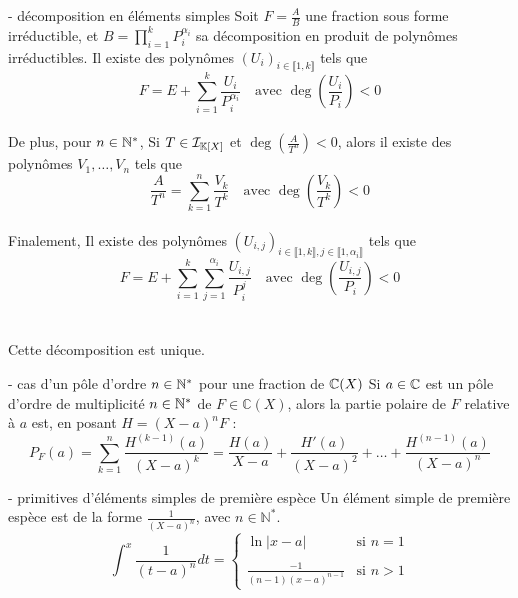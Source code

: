     \begin{theoreme}{17.34}{ - décomposition en éléments simples}
        Soit $F = \frac{A}{B}$ une fraction sous forme irréductible, et $B = \prod_{i=1}^{k}P_i^{\alpha_i}$ sa décomposition en produit de polynômes irréductibles. Il existe des polynômes $(U_{i})_{i \in \llbracket 1,k \rrbracket}$ tels que $$F = E + \sum_{i=1}^{k}\frac{U_{i}}{P_i^{\alpha_i}} \quad \text{avec $\deg(\frac{U_{i}}{P_i})<0$} $$ \\
        De plus, pour $n \in \mathbb{N}^*$, Si $T \in \mathcal{I}_{\mathbb{K}[X]} $ et $\deg(\frac{A}{T^n})<0$, alors il existe des polynômes $V_1,\dots,V_n$ tels que $$\frac{A}{T^n} = \sum_{k=1}^{n}\frac{V_k}{T^k} \quad \text{avec $\deg(\frac{V_k}{T^k})<0$}$$ \\
        Finalement, Il existe des polynômes $(U_{i,j})_{i \in \llbracket 1,k \rrbracket, j \in \llbracket 1,\alpha_i \rrbracket}$ tels que $$F = E + \sum_{i=1}^{k}\sum_{j=1}^{\alpha_i}\frac{U_{i,j}}{P_i^j} \quad \text{avec $\deg(\frac{U_{i,j}}{P_i})<0$} $$ \\ \\
        Cette décomposition est unique.
    \end{theoreme}

    \begin{proposition}{17.40}{ - cas d'un pôle d'ordre $n \in \mathbb{N}^*$ pour une fraction de $\mathbb{C}(X)$}
        Si $a \in \mathbb{C}$ est un pôle d'ordre de multiplicité $n \in \mathbb{N}^*$ de $F \in \mathbb{C}(X)$, alors la partie polaire de $F$ relative à $a$ est, en posant $H = (X-a)^n F$ : $$P_F(a) = \sum_{k=1}^{n}\frac{H^{(k-1)}(a)}{(X-a)^k} = \frac{H(a)}{X-a} + \frac{H'(a)}{(X-a)^2}+\dots + \frac{H^{(n-1)}(a)}{(X-a)^n}$$
        
    \end{proposition}

    \begin{remarque}{17.51}{ - primitives d'éléments simples de première espèce}
        Un élément simple de première espèce est de la forme $\frac{1}{(X-a)^n}$, avec $n \in \mathbb{N}^*$.
        $$\int^{x} \frac{1}{(t-a)^n}dt = \begin{cases}\ln|x-a| & \text{si $n=1$} \\ \\\frac{-1}{(n-1)(x-a)^{n-1}} & \text{si $n > 1$}\end{cases}$$
    \end{remarque}

